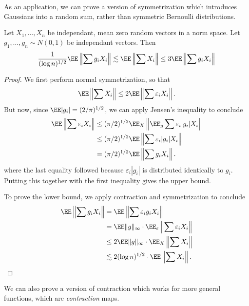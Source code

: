 As an application, we can prove a version of symmetrization which introduces Gaussians into a random sum, rather than symmetric Bernoulli distributions.

\begin{theorem}
    Let $X_1, \dots, X_n$ be independant, mean zero random vectors in a norm space. Let $g_1, \dots, g_n \sim N(0,1)$ be independant vectors. Then
    \[ \frac{1}{(\log n)^{1/2}} \EE \left\| \sum g_i X_i \right\| \lesssim \EE \left\| \sum X_i \right\| \leq 3 \EE \left\| \sum g_i X_i \right\| \]
\end{theorem}
\begin{proof}
	We first perform normal symmetrization, so that
    \[  \EE \left\| \sum X_i \right\| \leq 2 \EE \left\| \sum \varepsilon_i X_i \right\|. \]
    But now, since $\EE |g_i| = (2/\pi)^{1/2}$, we can apply Jensen's inequality to conclude
    \begin{align*}
    	\EE \left\| \sum \varepsilon_i X_i \right\| &\leq (\pi/2)^{1/2} \EE_X \left\|  \EE_g \sum \varepsilon_i |g_i| X_i \right\| \\
    	&\leq (\pi/2)^{1/2} \EE \left\| \sum \varepsilon_i |g_i| X_i \right\|\\
    	&= (\pi/2)^{1/2} \EE \left\| \sum g_i X_i \right\|.
    \end{align*}
    where the last equality followed because $\varepsilon_i |g_i|$ is distributed identically to $g_i$. Putting this together with the first inequality gives the upper bound.

    To prove the lower bound, we apply contraction and symmetrization to conclude
    \begin{align*}
    	\EE \left\| \sum g_i X_i \right\| &= \EE \left\| \sum \varepsilon_i g_i X_i \right\|\\
    	&= \EE \| g \|_\infty \cdot \EE_\varepsilon \left\| \sum \varepsilon_i X_i \right\|\\
    	&\leq 2 \EE \| g \|_\infty \cdot \EE_X \left\| \sum X_i \right\|\\
    	&\lesssim 2 (\log n)^{1/2} \cdot \EE \left\| \sum X_i \right\|. \qedhere
    \end{align*}
\end{proof}

We can also prove a version of contraction which works for more general functions, which are {\it contraction} maps.

